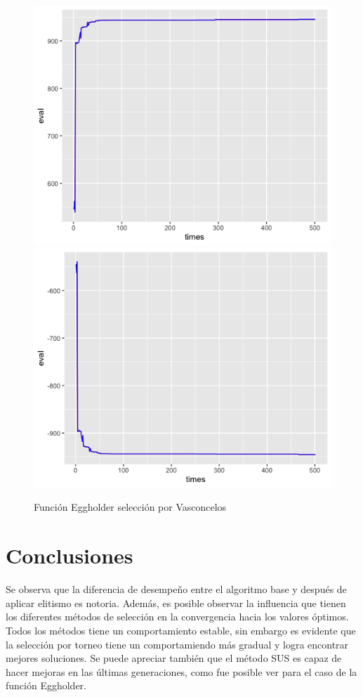 \documentclass[letterpaper,12pt]{article}
\theoremstyle{definition}
\begin{document}
\begin{figure}[H]
    \includegraphics[width=\linewidth]{egg_vas_fitness}
  \endminipage\hfill
    \includegraphics[width=\linewidth]{egg_vas_eval}
  \endminipage\hfill
  \caption{Función Eggholder selección por Vasconcelos}
  \label{fig:egg_vas}
\end{figure}

\section*{Conclusiones}

Se observa que la diferencia de desempeño entre el algoritmo base y después de aplicar elitismo es notoria. Además, es posible observar la influencia que tienen los diferentes métodos de selección en la convergencia hacia los valores óptimos. Todos los métodos tiene un comportamiento estable, sin embargo es evidente que la selección por torneo tiene un comportamiendo más gradual y logra encontrar mejores soluciones. Se puede apreciar también que el método SUS es capaz de hacer mejoras en las últimas generaciones, como fue posible ver para el caso de la función Eggholder.
\end{document}
